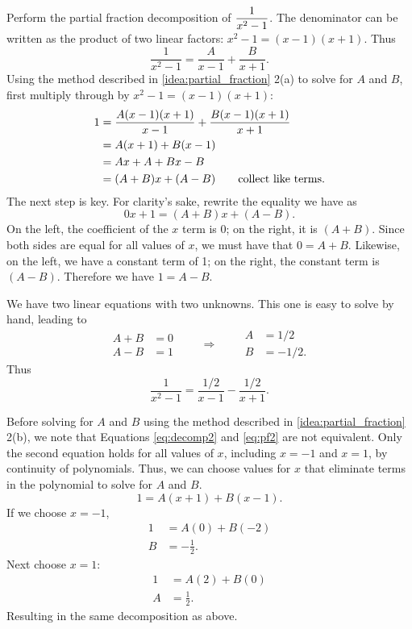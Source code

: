 \begin{example}\label{ex_pf2}%
Perform the partial fraction decomposition of $\displaystyle \frac{1}{x^2-1}$.
\solution
The denominator can be written as the product of two linear factors: $x^2-1 = (x-1)(x+1)$. Thus 
\begin{equation}\label{eq:decomp2}%
 \frac{1}{x^2-1} = \frac{A}{x-1} + \frac{B}{x+1}.
\end{equation}
Using the method described in \autoref{idea:partial_fraction} 2(a) to solve for $A$ and $B$, first multiply through by $x^2-1 = (x-1)(x+1)$:
\begin{align}\label{eq:pf2}%
	1
	&= \frac{A(x-1)(x+1)}{x-1}+\frac{B(x-1)(x+1)}{x+1} \notag\\
	&= A(x+1) + B(x-1)\\
	&= Ax+A + Bx-B \notag\\
	&= (A+B)x + (A-B)\qquad\text{collect like terms.}\notag
\end{align}
The next step is key. %
For clarity's sake, rewrite the equality we have as
\[0x+1 = (A+B)x+(A-B).\]
On the left, the coefficient of the $x$ term is 0; on the right, it is $(A+B)$. Since both sides are equal for all values of $x$, we must have that $0=A+B$. Likewise, on the left, we have a constant term of 1; on the right, the constant term is $(A-B)$. Therefore we have $1=A-B$.

We have two linear equations with two unknowns. This one is easy to solve by hand, leading to 
\[
 \begin{aligned}A+B&=0\\A-B&=1\end{aligned}
 \qquad\Rightarrow\qquad
 \begin{aligned}A&=1/2\\B&=-1/2.\end{aligned}
\]
Thus
\[\frac{1}{x^2-1}=\frac{1/2}{x-1}-\frac{1/2}{x+1}.\]

Before solving for $A$ and $B$ using the method described in \autoref{idea:partial_fraction} 2(b), we note that Equations \eqref{eq:decomp2} and \eqref{eq:pf2} are not equivalent. Only the second equation holds for all values of $x$, including $x=-1$ and $x=1$, by continuity of polynomials. Thus, we can choose values for $x$ that eliminate terms in the polynomial to solve for $A$ and $B$.
\[1=A(x+1) + B(x-1).\]
If we choose $x=-1$,
\begin{align*}
 1&=A(0) + B(-2) \\
 B&=-\frac{1}{2}.
\end{align*}
Next choose $x=1$:
\begin{align*}
 1&=A(2) + B(0) \\
 A&=\frac{1}{2}.
\end{align*}
Resulting in the same decomposition as above.
\end{example}

